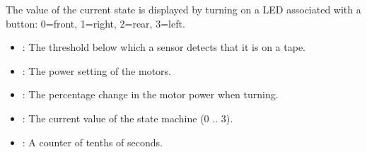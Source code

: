 The value of the current state is displayed by turning on a LED
associated with a button: 0=front, 1=right, 2=rear, 3=left.



\begin{itemize}
\item {}: The threshold below which a sensor detects that it
is on a tape.

\item {}: The power setting of the motors.

\item {}: The percentage change in the motor power when turning.
\end{itemize}


\begin{itemize}
\item {}: The current value of the state machine (0 .. 3). 
\item {}:  A counter of tenths of seconds.

\end{itemize}


